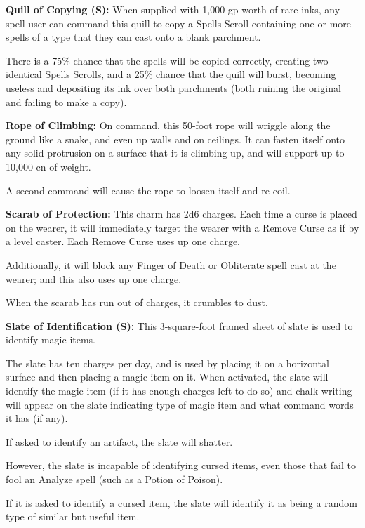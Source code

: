 \begin{multicols*}{2}
\textbf{Quill of Copying (S):} When supplied with 1,000 gp worth of rare inks, any spell user can command this quill to copy a Spells Scroll containing one or more spells of a type that they can cast onto a blank parchment.

There is a 75\% chance that the spells will be copied correctly, creating two identical Spells Scrolls, and a 25\% chance that the quill will burst, becoming useless and depositing its ink over both parchments (both ruining the original and failing to make a copy).

\textbf{Rope of Climbing:} On command, this 50-foot rope will wriggle along the ground like a snake, and even up walls and on ceilings. It can fasten itself onto any solid protrusion on a surface that it is climbing up, and will support up to 10,000 cn of weight.

A second command will cause the rope to loosen itself and re-coil.

\textbf{Scarab of Protection:} This charm has 2d6 charges. Each time a curse is placed on the wearer, it will immediately target the wearer with a Remove Curse as if by a  level caster. Each Remove Curse uses up one charge.

Additionally, it will block any Finger of Death or Obliterate spell cast at the wearer; and this also uses up one charge.

When the scarab has run out of charges, it crumbles to dust.

\textbf{Slate of Identification (S):} This 3-square-foot framed sheet of slate is used to identify magic items.

The slate has ten charges per day, and is used by placing it on a horizontal surface and then placing a magic item on it. When activated, the slate will identify the magic item (if it has enough charges left to do so) and chalk writing will appear on the slate indicating type of magic item and what command words it has (if any).

If asked to identify an artifact, the slate will shatter.

However, the slate is incapable of identifying cursed items, even those that fail to fool an Analyze spell (such as a Potion of Poison).

If it is asked to identify a cursed item, the slate will identify it as being a random type of similar but useful item.


\end{multicols*}
